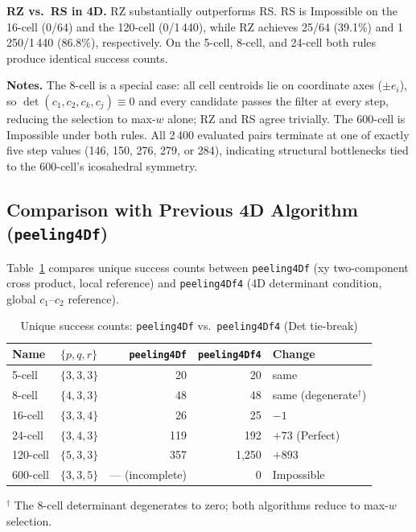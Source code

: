 \documentclass[12pt,a4paper]{article}
\theoremstyle{definition}
\begin{document}
\noindent
\textbf{RZ vs.\ RS in 4D.}
RZ substantially outperforms RS.
RS is Impossible on the 16-cell (0/64) and the 120-cell (0/1\,440),
while RZ achieves 25/64 (39.1\%) and 1\,250/1\,440 (86.8\%), respectively.
On the 5-cell, 8-cell, and 24-cell both rules produce identical success counts.

\smallskip\noindent
\textbf{Notes.}
The 8-cell is a special case: all cell centroids lie on coordinate axes
($\pm e_i$), so $\det(c_1,c_2,c_k,c_j)\equiv 0$ and every candidate
passes the filter at every step, reducing the selection to max-$w$ alone;
RZ and RS agree trivially.
The 600-cell is Impossible under both rules.
All 2\,400 evaluated pairs terminate at one of exactly five step values
(146, 150, 276, 279, or 284), indicating structural bottlenecks
tied to the 600-cell's icosahedral symmetry.

\subsection{Comparison with Previous 4D Algorithm (\texttt{peeling4Df})}
\label{ssec:res4dcomp}

Table~\ref{tab:res4dcomp} compares unique success counts between
\texttt{peeling4Df} (xy two-component cross product, local reference)
and \texttt{peeling4Df4} (4D determinant condition, global $c_1$--$c_2$
reference).

\begin{table}[h]
\centering
\caption{Unique success counts: \texttt{peeling4Df} vs.\ \texttt{peeling4Df4} (Det tie-break)}
\label{tab:res4dcomp}
\begin{tabular}{llrrl}
\toprule
Name & $\{p,q,r\}$ & \texttt{peeling4Df} & \texttt{peeling4Df4} & Change \\
\midrule
5-cell   & $\{3,3,3\}$ &   20 &       20 & same \\
8-cell   & $\{4,3,3\}$ &   48 &       48 & same (degenerate$^\dagger$) \\
16-cell  & $\{3,3,4\}$ &   26 &       25 & $-1$ \\
24-cell  & $\{3,4,3\}$ &  119 &      192 & $+73$ (Perfect) \\
120-cell & $\{5,3,3\}$ &  357 & 1{,}250 & $+893$ \\
600-cell & $\{3,3,5\}$ & --- (incomplete) &        0 & Impossible \\
\bottomrule
\end{tabular}
\end{table}

\noindent
$^\dagger$ The 8-cell determinant degenerates to zero; both algorithms
reduce to max-$w$ selection.
\end{document}
